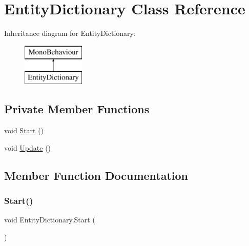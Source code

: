 \hypertarget{class_entity_dictionary}{}\section{Entity\+Dictionary Class Reference}
\label{class_entity_dictionary}
Inheritance diagram for Entity\+Dictionary\+:\begin{figure}[H]
\begin{center}
\leavevmode
\includegraphics[height=2.000000cm]{class_entity_dictionary}
\end{center}
\end{figure}
\subsection*{Private Member Functions}
\begin{DoxyCompactItemize}
\item 
void \hyperlink{class_entity_dictionary_a592c626d86d178f69e9515a746c264d8}{Start} ()
\item 
void \hyperlink{class_entity_dictionary_a0d8b0d1c4b288bb0ec395f50816e9800}{Update} ()
\end{DoxyCompactItemize}


\subsection{Member Function Documentation}
\mbox{\label{class_entity_dictionary_a592c626d86d178f69e9515a746c264d8}} 
\subsubsection{\texorpdfstring{Start()}{Start()}}
{\footnotesize\ttfamily void Entity\+Dictionary.\+Start (\begin{DoxyParamCaption}{ }\end{DoxyParamCaption})\hspace{0.3cm}{\ttfamily [private]}}

\mbox{\label{class_entity_dictionary_a0d8b0d1c4b288bb0ec395f50816e9800}} 

